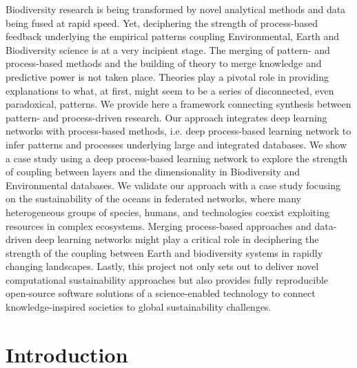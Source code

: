 \documentclass[12pt,a4paper]{article}
\begin{document}
Biodiversity research is being transformed
by novel analytical methods and data being fused at rapid
speed. Yet, deciphering the strength of process-based feedback
underlying the empirical patterns coupling Environmental, Earth and
Biodiversity science is at a very
incipient stage. The merging of pattern- and process-based methods and the building
of theory to merge knowledge and predictive power is not taken
place. Theories play a pivotal role in providing explanations to
what, at first, might seem to be a series of disconnected, even
paradoxical, patterns. We provide here a framework connecting
synthesis between pattern- and process-driven research. Our approach
integrates deep learning networks with process-based methods, i.e. deep
process-based learning network to infer patterns and processes
underlying large and integrated databases. We show a case study
using a deep process-based learning network to explore the strength of
coupling between layers and the dimensionality in Biodiversity and
Environmental databases. We validate our approach with a case study focusing on the sustainability of the oceans in federated networks, where many heterogeneous groups of species, humans, and technologies coexist exploiting resources in complex ecosystems. Merging process-based approaches and
data-driven deep learning networks might play a critical role in
deciphering the strength of the coupling between Earth and
biodiversity systems in rapidly changing landscapes. Lastly, this project not only sets out to deliver novel computational sustainability approaches but also provides fully reproducible open-source software solutions of a science-enabled technology to connect knowledge-inspired societies to global sustainability challenges.

\newpage

\section{Introduction}
\end{document}
